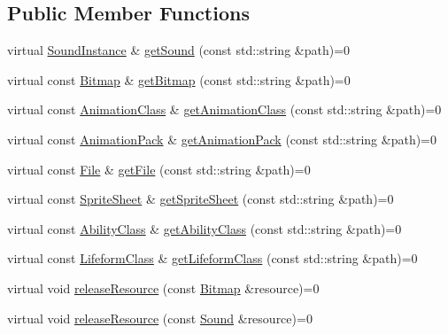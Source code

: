 \subsection*{Public Member Functions}
\begin{DoxyCompactItemize}
\item 
virtual \hyperlink{classZeta_1_1SoundInstance}{Sound\+Instance} \& \hyperlink{classZeta_1_1ResourceContext_a99ebb244f5c39029064d2bbab258734e}{get\+Sound} (const std\+::string \&path)=0
\item 
virtual const \hyperlink{classZeta_1_1Bitmap}{Bitmap} \& \hyperlink{classZeta_1_1ResourceContext_a986f4506f9d8c626e37652f4947ac468}{get\+Bitmap} (const std\+::string \&path)=0
\item 
virtual const \hyperlink{classZeta_1_1AnimationClass}{Animation\+Class} \& \hyperlink{classZeta_1_1ResourceContext_a09c7fc0046ae45ea5965b220d77f4be9}{get\+Animation\+Class} (const std\+::string \&path)=0
\item 
virtual const \hyperlink{classZeta_1_1AnimationPack}{Animation\+Pack} \& \hyperlink{classZeta_1_1ResourceContext_a9fa4e4df1de9c377fc65f7dcd635ff8f}{get\+Animation\+Pack} (const std\+::string \&path)=0
\item 
virtual const \hyperlink{classZeta_1_1File}{File} \& \hyperlink{classZeta_1_1ResourceContext_a017710935af7fcacca2a4e2885d196d2}{get\+File} (const std\+::string \&path)=0
\item 
virtual const \hyperlink{classZeta_1_1SpriteSheet}{Sprite\+Sheet} \& \hyperlink{classZeta_1_1ResourceContext_a6564190a3f21b0d1c0bc32b975390f7d}{get\+Sprite\+Sheet} (const std\+::string \&path)=0
\item 
virtual const \hyperlink{classZeta_1_1AbilityClass}{Ability\+Class} \& \hyperlink{classZeta_1_1ResourceContext_a7daeeb09f333778959f0dc842e63190b}{get\+Ability\+Class} (const std\+::string \&path)=0
\item 
virtual const \hyperlink{classZeta_1_1LifeformClass}{Lifeform\+Class} \& \hyperlink{classZeta_1_1ResourceContext_aed4ba06d87808b0177e2b0a9224f69f7}{get\+Lifeform\+Class} (const std\+::string \&path)=0
\item 
virtual void \hyperlink{classZeta_1_1ResourceContext_a8a04cda626646eca5621394c9427a78e}{release\+Resource} (const \hyperlink{classZeta_1_1Bitmap}{Bitmap} \&resource)=0
\item 
virtual void \hyperlink{classZeta_1_1ResourceContext_a80d832c39ab1add3ca3e760c62335f85}{release\+Resource} (const \hyperlink{classZeta_1_1Sound}{Sound} \&resource)=0
\item 

\end{DoxyCompactItemize}
